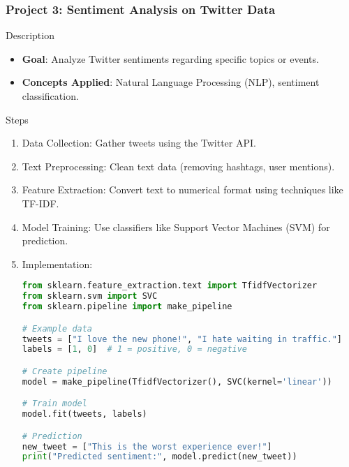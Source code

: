\documentclass[aspectratio=169]{beamer}
\begin{document}
\begin{frame}[fragile]
    \frametitle{Project 3: Sentiment Analysis on Twitter Data}
    \begin{block}{Description}
        \begin{itemize}
            \item \textbf{Goal}: Analyze Twitter sentiments regarding specific topics or events.
            \item \textbf{Concepts Applied}: Natural Language Processing (NLP), sentiment classification.
        \end{itemize}
    \end{block}
    
    \begin{block}{Steps}
        \begin{enumerate}
            \item Data Collection: Gather tweets using the Twitter API.
            \item Text Preprocessing: Clean text data (removing hashtags, user mentions).
            \item Feature Extraction: Convert text to numerical format using techniques like TF-IDF.
            \item Model Training: Use classifiers like Support Vector Machines (SVM) for prediction.
            \item Implementation:
            \begin{lstlisting}[language=Python]
from sklearn.feature_extraction.text import TfidfVectorizer
from sklearn.svm import SVC
from sklearn.pipeline import make_pipeline

# Example data
tweets = ["I love the new phone!", "I hate waiting in traffic."]
labels = [1, 0]  # 1 = positive, 0 = negative

# Create pipeline
model = make_pipeline(TfidfVectorizer(), SVC(kernel='linear'))

# Train model
model.fit(tweets, labels)

# Prediction
new_tweet = ["This is the worst experience ever!"]
print("Predicted sentiment:", model.predict(new_tweet))
            \end{lstlisting}
        \end{enumerate}
    \end{block}
\end{frame}
\end{document}
